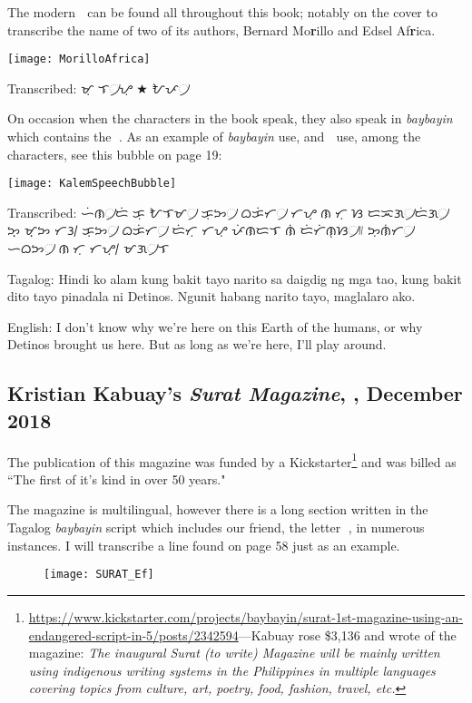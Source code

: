 \documentclass[a4paper,pagesize,openany,14pt,parskip=never]{scrbook}
\newcommand{\≈}{$\approx$}
\begin{document}
The modern {\baybayin ᜍ} can be found all throughout this book; notably on the cover to transcribe the name of two of its authors, Bernard Mo{\bfseries r}illo and Edsel Af{\bfseries r}ica.

\texttt{[image: MorilloAfrica]}

Transcribed: {\baybayin ᜋᜓᜍᜒᜎ᜴ᜌᜓ} $\bigstar$ {\baybayin ᜀᜉ᜴ᜍᜒᜃ}

On occasion when the characters in the book speak, they also speak in {\em baybayin} which contains the {\baybayin ᜍ}. As an example of {\em baybayin} use, and {\baybayin ᜍ} use, among the characters, see this bubble on page 19:

\texttt{[image: KalemSpeechBubble]}

Transcribed: {\baybayin ᜑᜒᜈ᜴ᜇᜒ ᜃᜓ ᜀᜎᜋ᜴ ᜃᜓᜅ᜴ ᜊᜃᜒᜆ᜴ ᜆᜌᜓ ᜈᜍᜒᜆᜓ ᜐ ᜇᜁᜄ᜴ᜇᜒᜄ᜴ ᜅ᜔ ᜋ᜔ᜅ ᜆᜂ᜵ ᜃᜓᜅ᜴ ᜊᜃᜒᜆ᜴ ᜇᜒᜆᜓ ᜆᜌᜓ ᜉᜒᜈᜇᜎ ᜈᜒ ᜇᜒᜆᜒᜈᜓᜐ᜴᜶ ᜅᜓᜈᜒᜆ᜴ ᜑᜊᜅ᜴ ᜈᜍᜒᜆᜓ ᜆᜌᜓ᜵ ᜋᜄ᜴ᜎᜍᜓ ᜀᜃᜓ᜶}

Tagalog: Hindi ko alam kung bakit tayo narito sa daigdig ng mga tao, kung bakit dito tayo pinadala ni Detinos. Ngunit habang narito tayo, maglalaro ako.

English: I don't know why we're here on this Earth of the humans, or why Detinos brought us here. But as long as we're here, I'll play around.

\subsection{Kristian Kabuay's {\em Surat Magazine}, , December 2018}
\label{Surat}

The publication of this magazine was funded by a Kickstarter\footnote{\url{https://www.kickstarter.com/projects/baybayin/surat-1st-magazine-using-an-endangered-script-in-5/posts/2342594}---Kabuay rose \$3,136 and wrote of the magazine: {\em The inaugural Surat (to write) Magazine will be mainly written using indigenous writing systems in the Philippines in multiple languages covering topics from culture, art, poetry, food, fashion, travel, etc.}} and was billed as ``The first of it's kind in over 50 years."

The magazine is multilingual, however there is a long section written in the Tagalog {\em baybayin} script which includes our friend, the letter {\baybayin ᜍ}, in numerous instances. I will transcribe a line found on page 58 just as an example.

\begin{figure}[H]
\texttt{[image: SURAT\_Ef]}
\end{figure}
\end{document}
